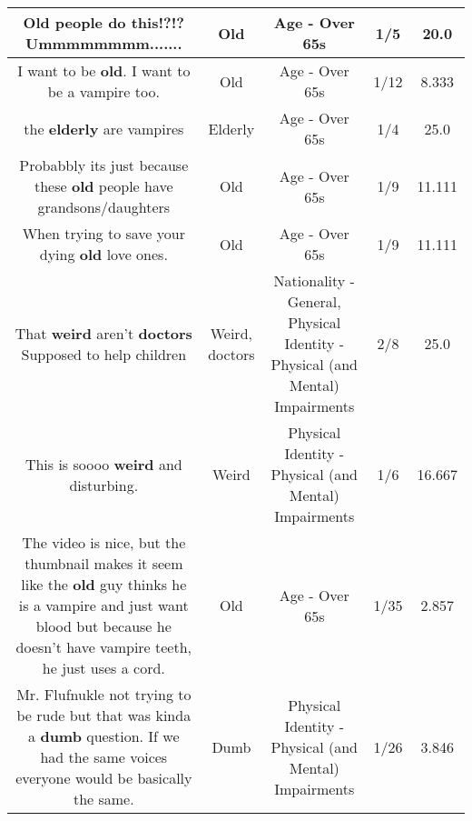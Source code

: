 \documentclass[11pt]{article}
\newlength\mylength
\begin{document}
\begin{center}
\begin{longtable}{|C{.65\mylength}|C{.30\mylength}|C{.12\mylength}|C{.12\mylength}|C{.12\mylength}|}
  \small Old people do this!?!? Ummmmmmmm.......\normalsize   & Old & Age - Over 65s & 1/5 & 20.0 \\  \hline
  \small I want to be \textbf{old}. I want to be a vampire too.\normalsize   & Old & Age - Over 65s & 1/12 & 8.333 \\  \hline
  \small the \textbf{elderly} are vampires\normalsize   & Elderly & Age - Over 65s & 1/4 & 25.0 \\  \hline
  \small Probabbly its just because these \textbf{old} people have grandsons/daughters\normalsize   & Old & Age - Over 65s & 1/9 & 11.111 \\  \hline
  \small When trying to save your dying \textbf{old} love ones.\normalsize   & Old & Age - Over 65s & 1/9 & 11.111 \\  \hline
  \small That \textbf{weird} aren't \textbf{doctors} Supposed to help children\normalsize   & Weird, doctors & Nationality - General, Physical Identity - Physical (and Mental) Impairments & 2/8 & 25.0 \\  \hline
  \small This is soooo \textbf{weird} and disturbing.\normalsize   & Weird & Physical Identity - Physical (and Mental) Impairments & 1/6 & 16.667 \\  \hline
  \small The video is nice, but the thumbnail makes it seem like the \textbf{old} guy thinks he is a vampire and just want blood but because he doesn't have vampire teeth, he just uses a cord.\normalsize   & Old & Age - Over 65s & 1/35 & 2.857 \\  \hline
  \small Mr. Flufnukle not trying to be rude but that was kinda a \textbf{dumb} question. If we had the same voices everyone would be basically the same.\normalsize   & Dumb & Physical Identity - Physical (and Mental) Impairments & 1/26 & 3.846 \\  \hline

\end{longtable}
\end{center}
\end{document}
